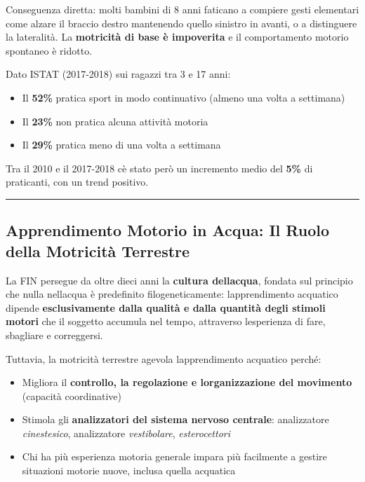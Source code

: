 \documentclass[a4paper,11pt]{article}
\providecommand{\tightlist}{%
  \setlength{\itemsep}{0pt}\setlength{\parskip}{0pt}}
\begin{document}
Conseguenza diretta: molti bambini di 8 anni faticano a compiere gesti
elementari come alzare il braccio destro mantenendo quello sinistro in
avanti, o a distinguere la lateralità. La \textbf{motricità di base è
      impoverita} e il comportamento motorio spontaneo è ridotto.

Dato ISTAT (2017-2018) sui ragazzi tra 3 e 17 anni:

\begin{itemize}
      \tightlist
      \item
            Il \textbf{52\%} pratica sport in modo continuativo (almeno una volta
            a settimana)
      \item
            Il \textbf{23\%} non pratica alcuna attività motoria
      \item
            Il \textbf{29\%} pratica meno di una volta a settimana
\end{itemize}

Tra il 2010 e il 2017-2018 c\textquotesingle è stato però un incremento
medio del \textbf{5\%} di praticanti, con un trend positivo.

\begin{center}\rule{0.5\linewidth}{0.5pt}\end{center}

\subsection{Apprendimento Motorio in Acqua: Il Ruolo della Motricità
      Terrestre}\label{apprendimento-motorio-in-acqua-il-ruolo-della-motricituxe0-terrestre}

La FIN persegue da oltre dieci anni la \textbf{cultura
      dell\textquotesingle acqua}, fondata sul principio che nulla
nell\textquotesingle acqua è predefinito filogeneticamente:
l\textquotesingle apprendimento acquatico dipende \textbf{esclusivamente
      dalla qualità e dalla quantità degli stimoli motori} che il soggetto
accumula nel tempo, attraverso l\textquotesingle esperienza di fare,
sbagliare e correggersi.

Tuttavia, la motricità terrestre agevola l\textquotesingle apprendimento
acquatico perché:

\begin{itemize}
      \tightlist
      \item
            Migliora il \textbf{controllo, la regolazione e
                  l\textquotesingle organizzazione del movimento} (capacità
            coordinative)
      \item
            Stimola gli \textbf{analizzatori del sistema nervoso centrale}:
            analizzatore \emph{cinestesico}, analizzatore \emph{vestibolare},
            \emph{esterocettori}
      \item
            Chi ha più esperienza motoria generale impara più facilmente a gestire
            situazioni motorie nuove, inclusa quella acquatica
\end{itemize}
\end{document}
